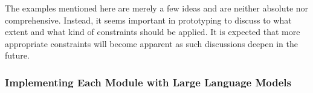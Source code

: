 The examples mentioned here are merely a few ideas and are neither absolute nor comprehensive. Instead, it seems important in prototyping to discuss to what extent and what kind of constraints should be applied. It is expected that more appropriate constraints will become apparent as such discussions deepen in the future.



\subsubsection{Implementing Each Module with Large Language Models}

